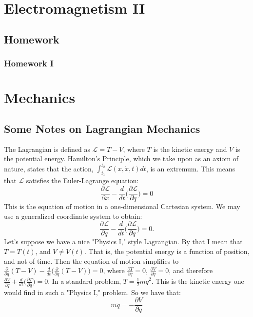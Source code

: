 \documentclass[oneside]{book}
\theoremstyle{mystyle}
\begin{document}
\chapter{Electromagnetism II}
\section{Homework}
\subsection{Homework I}
\chapter{Mechanics}
\section{Some Notes on Lagrangian Mechanics}
The Lagrangian is defined as $\mathcal{L} = T-V$, where $T$ is the kinetic energy and $V$ is the potential energy. Hamilton's Principle, which we take upon as an axiom of nature, states that the action, $\int_{t_1}^{t_2} \mathcal{L}(x,\dot{x},t)dt$, is an extremum. This means that $\mathcal{L}$ satisfies the Euler-Lagrange equation:
\begin{equation} 
\nonumber \frac{\partial \mathcal{L}}{\partial x} - \frac{d}{dt}\big(\frac{\partial \mathcal{L}}{\partial \dot{q}}\big) = 0
\end{equation}
This is the equation of motion in a one-dimensional Cartesian system. We may use a generalized coordinate system to obtain:
\begin{equation}
\nonumber \frac{\partial \mathcal{L}}{\partial q} - \frac{d}{dt} \big(\frac{\partial \mathcal{L}}{\partial \dot{q}}\big) = 0.
\end{equation}
Let's suppose we have a nice "Physics I," style Lagrangian. By that I mean that $T = T(t)$, and $V \ne V(t)$. That is, the potential energy is a function of position, and not of time. Then the equation of motion simplifies to $\frac{\partial}{\partial q}(T-V) - \frac{d}{dt}\big(\frac{\partial}{\partial \dot{q}}(T-V)\big) = 0$, where $\frac{\partial T}{\partial q} = 0$, $\frac{\partial V}{\partial \dot{q}} = 0$, and therefore $\frac{\partial V}{\partial q} + \frac{d}{dt}\big(\frac{\partial T}{\partial \dot{q}}\big) = 0$. In a standard problem, $T = \frac{1}{2}m \dot{q}^2$. This is the kinetic energy one would find in such a "Physics I," problem. So we have that:
\begin{equation}
\nonumber m\ddot{q} = -\frac{\partial V}{\partial q}
\end{equation}
\end{document}
